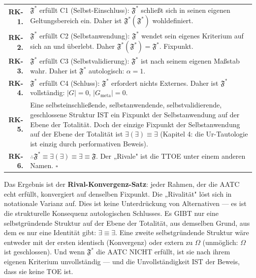 \documentclass[10pt, openany, oneside]{book}
\renewcommand{\footnotesize}{\fontsize{8.5}{11}\selectfont}
\begin{document}
{\footnotesize
\noindent\begin{tabular}{r p{}}
\textbf{RK-1.} & $\mathfrak{F}^*$ erfüllt C1 (Selbst-Einschluss): $\mathfrak{F}^*$ schließt sich in seinen eigenen Geltungsbereich ein. Daher ist $\mathfrak{F}^*(\mathfrak{F}^*)$ wohldefiniert. \\[0.3em]
\textbf{RK-2.} & $\mathfrak{F}^*$ erfüllt C2 (Selbstanwendung): $\mathfrak{F}^*$ wendet sein eigenes Kriterium auf sich an und überlebt. Daher $\mathfrak{F}^*(\mathfrak{F}^*) = \mathfrak{F}^*$. Fixpunkt. \\[0.3em]
\textbf{RK-3.} & $\mathfrak{F}^*$ erfüllt C3 (Selbstvalidierung): $\mathfrak{F}^*$ ist nach seinem eigenen Maßstab wahr. Daher ist $\mathfrak{F}^*$ autologisch: $\alpha = 1$. \\[0.3em]
\textbf{RK-4.} & $\mathfrak{F}^*$ erfüllt C4 (Schluss): $\mathfrak{F}^*$ erfordert nichts Externes. Daher ist $\mathfrak{F}^*$ vollständig: $|G| = 0$, $|G_{\text{meta}}| = 0$. \\[0.3em]
\textbf{RK-5.} & Eine selbsteinschließende, selbstanwendende, selbstvalidierende, geschlossene Struktur IST ein Fixpunkt der Selbstanwendung auf der Ebene der Totalität. Doch der einzige Fixpunkt der Selbstanwendung auf der Ebene der Totalität ist $\exists(\exists) \equiv \exists$ (Kapitel 4: die Ur-Tautologie ist einzig durch performativen Beweis). \\[0.3em]
\textbf{RK-6.} & $\therefore \mathfrak{F}^* \equiv \exists(\exists) \equiv \exists \equiv \mathfrak{F}$. Der „Rivale" ist die TTOE unter einem anderen Namen. $\square$ \\[0.3em]
\end{tabular}
}

\vspace{0.5em}

\noindent Das Ergebnis ist der \textbf{Rival-Konvergenz-Satz}: jeder Rahmen, der die AATC echt erfüllt, konvergiert auf denselben Fixpunkt. Die „Rivalität" löst sich in notationale Varianz auf. Dies ist keine Unterdrückung von Alternativen --- es ist die strukturelle Konsequenz autologischen Schlusses. Es GIBT nur eine selbstgründende Struktur auf der Ebene der Totalität, aus demselben Grund, aus dem es nur eine Identität gibt: $\exists \equiv \exists$. Eine zweite selbstgründende Struktur wäre entweder mit der ersten identisch (Konvergenz) oder extern zu $\Omega$ (unmöglich: $\Omega$ ist geschlossen). Und wenn $\mathfrak{F}^*$ die AATC NICHT erfüllt, ist sie nach ihrem eigenen Kriterium unvollständig --- und die Unvollständigkeit IST der Beweis, dass sie keine TOE ist.
\end{document}
